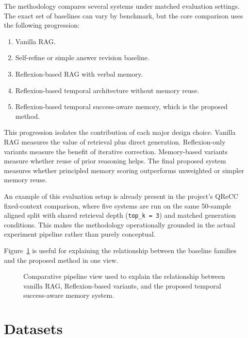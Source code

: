 The methodology compares several systems under matched evaluation settings. The exact set of baselines can vary by benchmark, but the core comparison uses the following progression:

\begin{enumerate}[leftmargin=*]
\item Vanilla RAG.
\item Self-refine or simple answer revision baseline.
\item Reflexion-based RAG with verbal memory.
\item Reflexion-based temporal architecture without memory reuse.
\item Reflexion-based temporal success-aware memory, which is the proposed method.
\end{enumerate}

This progression isolates the contribution of each major design choice. Vanilla RAG measures the value of retrieval plus direct generation. Reflexion-only variants measure the benefit of iterative correction. Memory-based variants measure whether reuse of prior reasoning helps. The final proposed system measures whether principled memory scoring outperforms unweighted or simpler memory reuse.

An example of this evaluation setup is already present in the project's QReCC fixed-context comparison, where five systems are run on the same 50-sample aligned split with shared retrieval depth (\texttt{top\_k = 3}) and matched generation conditions. This makes the methodology operationally grounded in the actual experiment pipeline rather than purely conceptual.

Figure~\ref{fig:methodology-comparison} is useful for explaining the relationship between the baseline families and the proposed method in one view.

\begin{figure}[H]
    \centering
    
    \caption{Comparative pipeline view used to explain the relationship between vanilla RAG, Reflexion-based variants, and the proposed temporal success-aware memory system.}
    \label{fig:methodology-comparison}
\end{figure}

\section{Datasets}
\label{sec:methodology-datasets}

